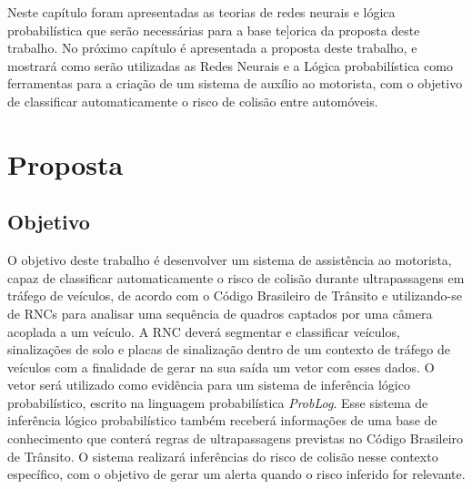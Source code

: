 \documentclass[
	12pt,				%
    oneside,			%
	a4paper,			%
	english,			%
	french,				%
	spanish,			%
	brazil,				%
	]{abntex2}
\begin{document}
Neste capítulo foram apresentadas as teorias de redes neurais e lógica probabilística que serão necessárias para a base te]orica da proposta deste trabalho. No próximo capítulo é apresentada a proposta deste trabalho, e mostrará como serão utilizadas as Redes Neurais e a Lógica probabilística como ferramentas para a criação de um sistema de auxílio ao motorista, com o objetivo de classificar automaticamente o risco de colisão entre automóveis.










\chapter {Proposta}

\section {Objetivo}
O objetivo deste trabalho é desenvolver um sistema de assistência ao motorista, capaz de classificar automaticamente o risco de colisão durante ultrapassagens em tráfego de veículos, de acordo com o Código Brasileiro de Trânsito e utilizando-se de RNCs para analisar uma sequência de quadros captados por uma câmera acoplada a um veículo. A RNC deverá segmentar e classificar veículos, sinalizações de solo e placas de sinalização dentro de um contexto de tráfego de veículos com a finalidade de gerar na sua saída um vetor com esses dados. O vetor será utilizado como evidência para um sistema de inferência lógico probabilístico, escrito na linguagem probabilística \textit{ProbLog}. Esse sistema de inferência lógico probabilístico também receberá informações de uma base de conhecimento que conterá regras de ultrapassagens previstas no Código Brasileiro de Trânsito. O sistema realizará inferências do risco de colisão nesse contexto específico, com o objetivo de gerar um alerta quando o risco inferido for relevante.
\end{document}
